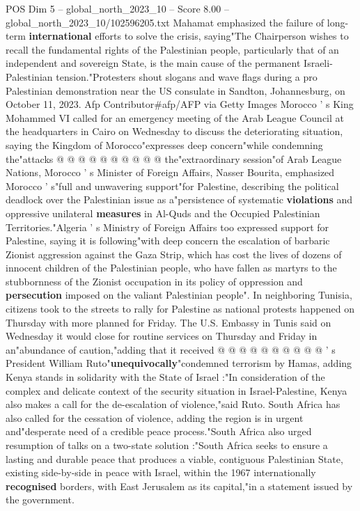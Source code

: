 \begin{textsample}{POS Dim 5 – global\_north\_2023\_10 – Score 8.00 – global\_north\_2023\_10/102596205.txt}
Mahamat emphasized the failure of long-term \textbf{international} efforts to solve the crisis, saying"The Chairperson wishes to recall the fundamental rights of the Palestinian people, particularly that of an independent and sovereign State, is the main cause of the permanent Israeli-Palestinian tension."Protesters shout slogans and wave flags during a pro Palestinian demonstration near the US consulate in Sandton, Johannesburg, on October 11, 2023.
Afp Contributor\#afp/AFP via Getty Images Morocco ' s King Mohammed VI called for an emergency meeting of the Arab League Council at the headquarters in Cairo on Wednesday to discuss the deteriorating situation, saying the Kingdom of Morocco"expresses deep concern"while condemning the"attacks @ @ @ @ @ @ @ @ @ @ the"extraordinary session"of Arab League Nations, Morocco ' s Minister of Foreign Affairs, Nasser Bourita, emphasized Morocco ' s"full and unwavering support"for Palestine, describing the political deadlock over the Palestinian issue as a"persistence of systematic \textbf{violations} and oppressive unilateral \textbf{measures} in Al-Quds and the Occupied Palestinian Territories."Algeria ' s Ministry of Foreign Affairs too expressed support for Palestine, saying it is following"with deep concern the escalation of barbaric Zionist aggression against the Gaza Strip, which has cost the lives of dozens of innocent children of the Palestinian people, who have fallen as martyrs to the stubbornness of the Zionist occupation in its policy of oppression and \textbf{persecution} imposed on the valiant Palestinian people".
In neighboring Tunisia, citizens took to the streets to rally for Palestine as national protests happened on Thursday with more planned for Friday.
The U.S.
Embassy in Tunis said on Wednesday it would close for routine services on Thursday and Friday in an"abundance of caution,"adding that it received @ @ @ @ @ @ @ @ @ @ ' s President William Ruto"\textbf{unequivocally}"condemned terrorism by Hamas, adding Kenya stands in solidarity with the State of Israel :"In consideration of the complex and delicate context of the security situation in Israel-Palestine, Kenya also makes a call for the de-escalation of violence,"said Ruto.
South Africa has also called for the cessation of violence, adding the region is in urgent and"desperate need of a credible peace process."South Africa also urged resumption of talks on a two-state solution :"South Africa seeks to ensure a lasting and durable peace that produces a viable, contiguous Palestinian State, existing side-by-side in peace with Israel, within the 1967 internationally \textbf{recognised} borders, with East Jerusalem as its capital,"in a statement issued by the government.

\end{textsample}
